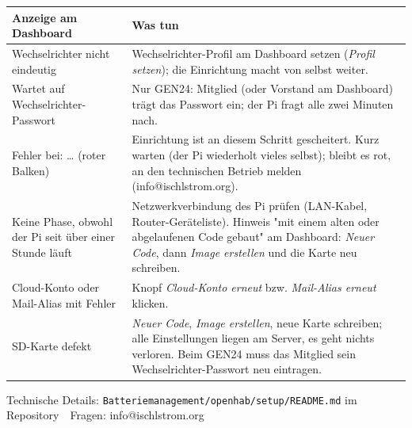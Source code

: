 \documentclass[a4paper,11pt]{article}
\newcommand{\phase}[1]{\textsf{\small #1}}
\begin{document}
\begin{tabularx}{\textwidth}{@{}p{}X@{}}
    \toprule
    \textbf{Anzeige am Dashboard} & \textbf{Was tun} \\
    \midrule
    \phase{Wechselrichter nicht eindeutig} &
    Wechselrichter-Profil am Dashboard setzen (\emph{Profil setzen});
    die Einrichtung macht von selbst weiter. \\
    \addlinespace
    \phase{Wartet auf Wechselrichter-Passwort} &
    Nur GEN24: Mitglied (oder Vorstand am Dashboard) trägt das Passwort
    ein; der Pi fragt alle zwei Minuten nach. \\
    \addlinespace
    \phase{Fehler bei: \ldots} (roter Balken) &
    Einrichtung ist an diesem Schritt gescheitert. Kurz warten (der Pi
    wiederholt vieles selbst); bleibt es rot, an den technischen
    Betrieb melden (info@ischlstrom.org). \\
    \addlinespace
    Keine Phase, obwohl der Pi seit über einer Stunde läuft &
    Netzwerkverbindung des Pi prüfen (LAN-Kabel, Router-Geräteliste).
    Hinweis "mit einem alten oder abgelaufenen Code gebaut" am
    Dashboard: \emph{Neuer Code}, dann \emph{Image erstellen} und die
    Karte neu schreiben. \\
    \addlinespace
    Cloud-Konto oder Mail-Alias mit Fehler &
    Knopf \emph{Cloud-Konto erneut} bzw. \emph{Mail-Alias erneut}
    klicken. \\
    \addlinespace
    SD-Karte defekt &
    \emph{Neuer Code}, \emph{Image erstellen}, neue Karte schreiben;
    alle Einstellungen liegen am Server, es geht nichts verloren. Beim
    GEN24 muss das Mitglied sein Wechselrichter-Passwort neu eintragen. \\
    \bottomrule
\end{tabularx}

\vspace{1em}
\begin{center}
    \small Technische Details: \texttt{Batteriemanagement/openhab/setup/README.md}
    im Repository \,\textbullet\, Fragen: info@ischlstrom.org
\end{center}
\end{document}
